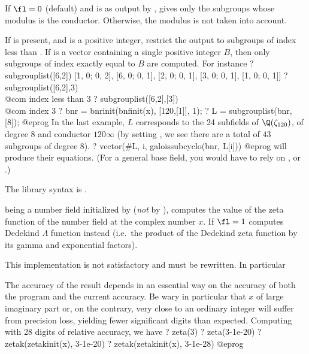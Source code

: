 If $\fl=0$ (default) and  is as output by , gives
only the subgroups whose modulus is the conductor. Otherwise, the modulus is
not taken into account.

If  is present, and is a positive integer, restrict the output to
subgroups of index less than . If  is a vector
containing a single positive integer $B$, then only subgroups of index
exactly equal to $B$ are computed. For instance
\bprog
? subgrouplist([6,2])
[1, 0; 0, 2], [6, 0; 0, 1], [2, 0; 0, 1], [3, 0; 0, 1], [1, 0; 0, 1]]
? subgrouplist([6,2],3)    \\@com index less than 3
? subgrouplist([6,2],[3])  \\@com index 3
? bnr = bnrinit(bnfinit(x), [120,[1]], 1);
? L = subgrouplist(bnr, [8]);
@eprog\noindent
In the last example, $L$ corresponds to the 24 subfields of
$\Q(\zeta_{120})$, of degree $8$ and conductor $120\infty$ (by setting \fl,
we see there are a total of $43$ subgroups of degree $8$).
\bprog
? vector(#L, i, galoissubcyclo(bnr, L[i]))
@eprog\noindent
will produce their equations. (For a general base field, you would
have to rely on , or .)

The library syntax is .

\label{se:zetak}
 being a number
field initialized by  (\emph{not} by ),
computes the value of the  zeta function of the number
field at the complex number $x$. If $\fl=1$ computes Dedekind $\Lambda$
function instead (i.e.~the product of the Dedekind zeta function by its gamma
and exponential factors).

 This implementation is not satisfactory and must be
rewritten. In particular

\item The accuracy of the result depends in an essential way on the
accuracy of both the  program and the current accuracy.
Be wary in particular that $x$ of large imaginary part or, on the
contrary, very close to an ordinary integer will suffer from precision
loss, yielding fewer significant digits than expected. Computing with 28
digits of relative accuracy, we have
\bprog
? zeta(3)
? zeta(3-1e-20)
? zetak(zetakinit(x), 3-1e-20)
? zetak(zetakinit(x), 3-1e-28)
@eprog

